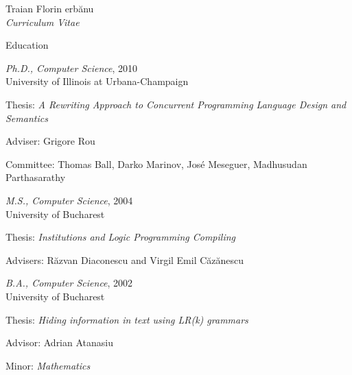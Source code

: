 \documentclass[10pt]{article}
\newcommand{\sh}{\unichar{0537}}
\newcommand{\Sh}{\unichar{0536}}
\newcommand{\tz}{\unichar{0539}}
\newcommand{\Serbanuta}{{\Sh}er\-b{\u a}\-nu\-{\tz}{\u a}}
\newcommand{\Rosu}{Ro\-{\sh}u}
\newenvironment{sublist}{%
    \begin{list}{}{%
        \setlength{\itemsep}{0em}\setlength{\parsep}{0em}%
        \setlength{\topsep}{0em}\setlength{\parskip}{0em}%
    }%
}%
{ \end{list} }
\begin{document}
\begin{cv}{Traian Florin \Serbanuta{}\\{\large \itshape Curriculum Vitae}}
\begin{cvlist}{Education}
    \item \emph{Ph.D., Computer Science}, 2010\\
    University of Illinois at Urbana-Champaign
    \begin{sublist}
        \item Thesis: \textit{A Rewriting Approach to Concurrent Programming Language Design and Semantics}
        \item Adviser: Grigore \Rosu{}
        \item Committee: Thomas Ball, Darko Marinov, Jos\'e Meseguer, Madhusudan Parthasarathy
    \end{sublist}
    \item \emph{M.S., Computer Science}, 2004\\ 
    University of Bucharest
    \begin{sublist}
        \item Thesis: \textit{Institutions and Logic Programming Compiling}
        \item Advisers: R{\u a}zvan Diaconescu and Virgil Emil C{\u a}z{\u a}nescu
    \end{sublist}
    \item \emph{B.A., Computer Science}, 2002\\
    University of Bucharest
    \begin{sublist}
        \item Thesis: \textit{Hiding information in text using LR(k) grammars}
        \item Advisor: Adrian Atanasiu
        \item Minor: \emph{Mathematics}
    \end{sublist}
\end{cvlist}



\end{cv}
\end{document}
